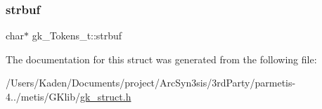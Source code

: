 \subsubsection{\texorpdfstring{strbuf}{strbuf}}
{\footnotesize\ttfamily char$\ast$ gk\+\_\+\+Tokens\+\_\+t\+::strbuf}



The documentation for this struct was generated from the following file\+:\begin{DoxyCompactItemize}
\item 
/\+Users/\+Kaden/\+Documents/project/\+Arc\+Syn3sis/3rd\+Party/parmetis-\/4../metis/\+G\+Klib/\hyperlink{a00080}{gk\+\_\+struct.\+h}\end{DoxyCompactItemize}

